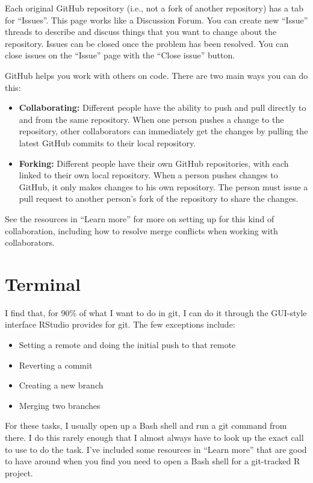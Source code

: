\documentclass[]{tufte-book}
\providecommand{\tightlist}{%
  \setlength{\itemsep}{0pt}\setlength{\parskip}{0pt}}
\begin{document}
Each original GitHub repository (i.e., not a fork of another repository) has a
tab for ``Issues''. This page works like a Discussion Forum. You can create new
``Issue'' threads to describe and discuss things that you want to change about the
repository. Issues can be closed once the problem has been resolved. You can
close issues on the ``Issue'' page with the ``Close issue'' button.

GitHub helps you work with others on code. There are two main ways you can do this:

\begin{itemize}
\tightlist
\item
  \textbf{Collaborating:} Different people have the ability to push and pull directly
  to and from the same repository. When one person pushes a change to the
  repository, other collaborators can immediately get the changes by pulling the
  latest GitHub commits to their local repository.
\item
  \textbf{Forking:} Different people have their own GitHub repositories, with each
  linked to their own local repository. When a person pushes changes to GitHub, it
  only makes changes to his own repository. The person must issue a pull request
  to another person's fork of the repository to share the changes.
\end{itemize}

See the resources in ``Learn more'' for more on setting up for this kind of collaboration,
including how to resolve merge conflicts when working with collaborators.

\hypertarget{terminal}{%
\section{Terminal}\label{terminal}}

I find that, for 90\% of what I want to do in git, I can do it through the GUI-style
interface RStudio provides for git. The few exceptions include:

\begin{itemize}
\tightlist
\item
  Setting a remote and doing the initial push to that remote
\item
  Reverting a commit
\item
  Creating a new branch
\item
  Merging two branches
\end{itemize}

For these tasks, I usually open up a Bash shell and run a git command from
there. I do this rarely enough that I almost always have to look up the exact
call to use to do the task. I've included some resources in ``Learn more'' that
are good to have around when you find you need to open a Bash shell for a
git-tracked R project.
\end{document}
